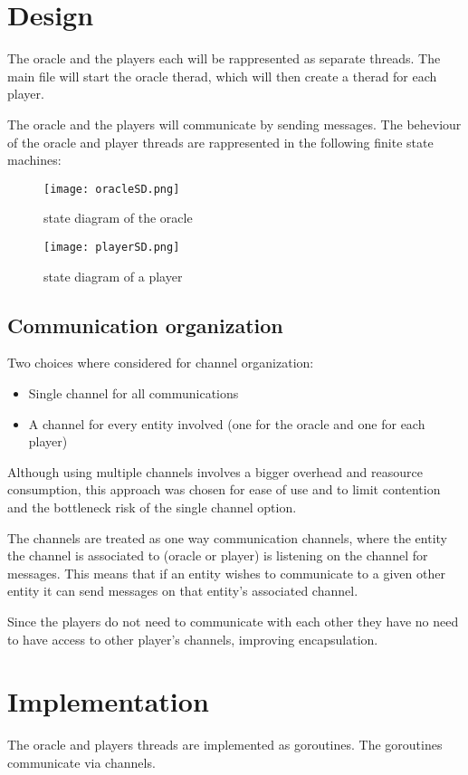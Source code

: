 \documentclass[12pt, a4paper]{report}
\begin{document}
\chapter{Design}
The oracle and the players each will be rappresented as separate threads. The main file will start the oracle therad, which will then create a therad for each player.

The oracle and the players will communicate by sending messages. The beheviour of the oracle and player threads are rappresented in the following finite state machines:

\begin{figure}
    \centering
    \texttt{[image: oracleSD.png]}
    \caption{state diagram of the oracle}\label{fig:oracleSD}
\end{figure}

\begin{figure}
    \centering
    \texttt{[image: playerSD.png]}
    \caption{state diagram of a player}\label{fig:playerSD}
\end{figure}

\section{Communication organization}
Two choices where considered for channel organization:
\begin{itemize}
    \item Single channel for all communications
    \item A channel for every entity involved (one for the oracle and one for each player)
\end{itemize}

\newpage

Although using multiple channels involves a bigger overhead and reasource consumption, this approach was chosen for ease of use and to limit contention and
 the bottleneck risk of the single channel option.

The channels are treated as one way communication channels, where the entity the channel is associated to (oracle or player) is listening on the channel for messages.
 This means that if an entity wishes to communicate to a given other entity it can send messages on that entity's associated channel.

Since the players do not need to communicate with each other they have no need to have access to other player's channels, improving encapsulation.
\chapter{Implementation}
The oracle and players threads are implemented as goroutines. The goroutines communicate via channels.
\end{document}
